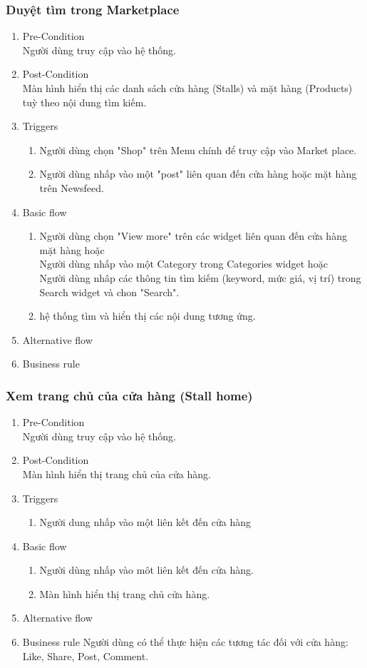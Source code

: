 \subsubsection{Duyệt tìm trong Marketplace}
\begin{enumerate}
	\item Pre-Condition\\
	Người dùng truy cập vào hệ thống.
	\item Post-Condition\\
	Màn hình hiển thị các danh sách cửa hàng (Stalls) và mặt hàng (Products) tuỳ theo nội dung tìm kiếm.
	\item Triggers
	\begin{enumerate}
		\item Người dùng chọn "Shop" trên Menu chính để truy cập vào Market place.
		\item Người dùng nhấp vào một "post" liên quan đến cửa hàng hoặc mặt hàng trên Newsfeed.
	\end{enumerate}
	\item Basic flow
	\begin{enumerate}
		\item Người dùng chọn "View more" trên các widget liên quan đến cửa hàng mặt hàng hoặc\\
		Người dùng nhấp vào một Category trong Categories widget hoặc\\
		Người dùng nhâp các thông tin tìm kiếm (keyword, mức giá, vị trí) trong Search widget và chon "Search".
		\item hệ thống tìm và hiển thị các nội dung tương ứng.
	\end{enumerate}
	\item Alternative flow
	\item Business rule
\end{enumerate}

\subsubsection{Xem trang chủ của cửa hàng (Stall home)}
\begin{enumerate}
	\item Pre-Condition\\
	Người dùng truy cập vào hệ thống.
	\item Post-Condition\\
	Màn hình hiển thị trang chủ của cửa hàng.
	\item Triggers
	\begin{enumerate}
		\item Người dung nhấp vào một liên kết đến cửa hàng
	\end{enumerate}
	\item Basic flow
	\begin{enumerate}
		\item Người dùng nhấp vào môt liên kết đến cửa hàng.
		\item Màn hình hiển thị trang chủ cửa hàng.
	\end{enumerate}
	\item Alternative flow
	\item Business rule
	Người dùng có thể thực hiện các tương tác đối với cửa hàng: Like, Share, Post, Comment.
\end{enumerate}

